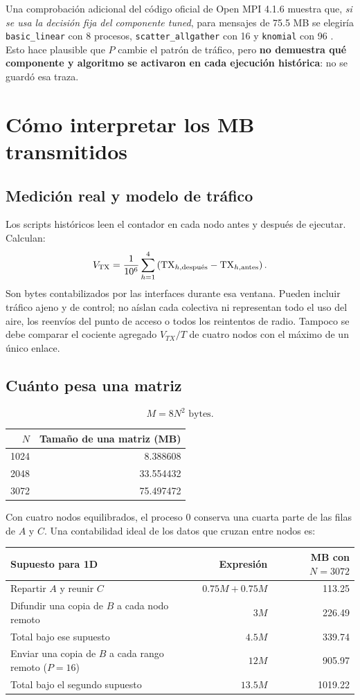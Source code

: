 Una comprobación adicional del código oficial de Open MPI 4.1.6 muestra que, \emph{si se usa la decisión fija del componente tuned}, para mensajes de 75.5 MB se elegiría \texttt{basic\_linear} con 8 procesos, \texttt{scatter\_allgather} con 16 y \texttt{knomial} con 96 \cite{ompi-source}. Esto hace plausible que $P$ cambie el patrón de tráfico, pero \textbf{no demuestra qué componente y algoritmo se activaron en cada ejecución histórica}: no se guardó esa traza.

\clearpage
\section{Cómo interpretar los MB transmitidos}

\subsection{Medición real y modelo de tráfico}
Los scripts históricos leen el contador  en cada nodo antes y después de ejecutar. Calculan:
\[
 V_{\rm TX}=\frac{1}{10^6}\sum_{h=1}^{4}
  \left(\mathrm{TX}_{h,\text{después}}-\mathrm{TX}_{h,\text{antes}}\right).
\]
Son bytes contabilizados por las interfaces durante esa ventana. Pueden incluir tráfico ajeno y de control; no aíslan cada colectiva ni representan todo el uso del aire, los reenvíos del punto de acceso o todos los reintentos de radio. Tampoco se debe comparar el cociente agregado $V_{TX}/T$ de cuatro nodos con el máximo de un único enlace.

\subsection{Cuánto pesa una matriz}
\[
 M=8N^2\text{ bytes}.
\]
\begin{center}
\begin{tabular}{rr}
\toprule
$N$ & Tamaño de una matriz (MB) \\
\midrule
1024 & 8.388608 \\
2048 & 33.554432 \\
3072 & 75.497472 \\
\bottomrule
\end{tabular}
\end{center}
Con cuatro nodos equilibrados, el proceso 0 conserva una cuarta parte de las filas de $A$ y $C$. Una contabilidad ideal de los datos que cruzan entre nodos es:
\begin{center}\small
\begin{tabular}{lrr}
\toprule
Supuesto para 1D & Expresión & MB con $N=3072$ \\
\midrule
Repartir $A$ y reunir $C$ & $0.75M+0.75M$ & 113.25 \\
Difundir una copia de $B$ a cada nodo remoto & $3M$ & 226.49 \\
Total bajo ese supuesto & $4.5M$ & 339.74 \\
Enviar una copia de $B$ a cada rango remoto ($P=16$) & $12M$ & 905.97 \\
Total bajo el segundo supuesto & $13.5M$ & 1019.22 \\
\bottomrule
\end{tabular}\end{center}

